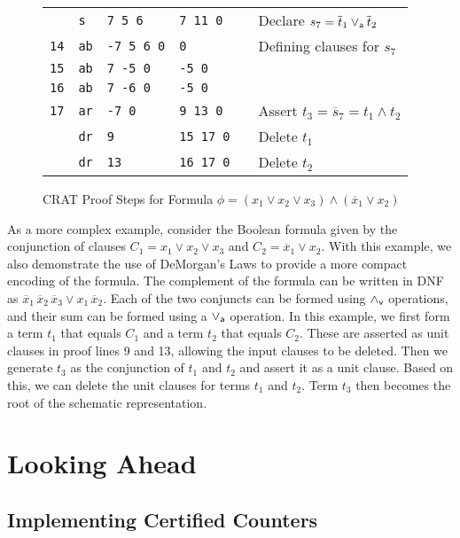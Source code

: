 \documentclass{llncs}
\newcommand{\pand}{\mathbin{\land_{\sf v}}}
\newcommand{\por}{\mathbin{\lor_{\sf a}}}
\newcommand{\obar}[1]{\overline{#1}}
\begin{document}
\begin{figure}
{\begin{tabular}{llllll}
            & {\tt s}   & {\tt 7 5 6}   & {\tt 7 11 0}  & & Declare $s_7 = \obar{t}_1 \por \obar{t}_2$ \\
    {\tt 14} & {\tt ab}  & {\tt -7 5 6 0}  & {\tt 0}    & & Defining clauses for $s_7$ \\ 
    {\tt 15} & {\tt ab}  & {\tt  7 -5 0}    & {\tt -5 0} &  \\  
    {\tt 16} & {\tt ab}  & {\tt  7 -6 0}    & {\tt -5 0} & &  \\
    {\tt 17} & {\tt ar}  & {\tt -7 0}       & {\tt 9 13 0} & & Assert $t_3 = \obar{s}_7 = t_1 \land t_2$ \\
             & {\tt dr}  & {\tt 9}          & {\tt 15 17 0} & & Delete $t_1$\\
             & {\tt dr}  & {\tt 13}         & {\tt 16 17 0} & & Delete $t_2$\\
  \end{tabular}
}  
  \caption{CRAT Proof Steps for Formula $\phi = (x_1 \lor x_2 \lor x_3) \land (\obar{x}_1 \lor x_2)$}
  \label{fig:p2:crat}
\end{figure}

As a more complex example, consider the Boolean formula given by the
conjunction of clauses $C_1 = x_1 \lor x_2 \lor x_3$ and $C_2 =
\obar{x}_1 \lor x_2$.  With this example, we also demonstrate the use
of DeMorgan's Laws to provide a more compact encoding of the formula.
The complement of the formula can be written in DNF as
$\obar{x}_1\,\obar{x}_2\,\obar{x}_3 \lor x_1\,\obar{x}_2$.  Each of
the two conjuncts can be formed using $\pand$ operations, and their
sum can be formed using a $\por$ operation.  In this example, we first
form a term $t_1$ that equals $C_1$ and a term $t_2$ that equals
$C_2$.  These are asserted as unit clauses in proof lines 9 and 13,
allowing the input clauses to be deleted.  Then we generate $t_3$ as
the conjunction of $t_1$ and $t_2$ and assert it as a unit clause.
Based on this, we can delete the unit clauses for terms $t_1$ and
$t_2$.  Term $t_3$ then becomes the root of the schematic representation.





\section{Looking Ahead}

\subsection{Implementing Certified Counters}
\end{document}
